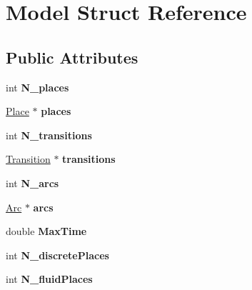\hypertarget{structModel}{\section{Model Struct Reference}
\label{structModel}
}
\subsection*{Public Attributes}
\begin{DoxyCompactItemize}
\item 
\hypertarget{structModel_a660f4623c98be1f351188bb2299284d9}{int {\bfseries N\-\_\-places}}\label{structModel_a660f4623c98be1f351188bb2299284d9}

\item 
\hypertarget{structModel_a68742d9a8f4a4a93bfb3f2687ecdccb9}{\hyperlink{structPlace}{Place} $\ast$ {\bfseries places}}\label{structModel_a68742d9a8f4a4a93bfb3f2687ecdccb9}

\item 
\hypertarget{structModel_a42637d14566751b5755f2b0d66529be4}{int {\bfseries N\-\_\-transitions}}\label{structModel_a42637d14566751b5755f2b0d66529be4}

\item 
\hypertarget{structModel_abbe7678bbc58a7e1e854dcb9545ed997}{\hyperlink{structTransition}{Transition} $\ast$ {\bfseries transitions}}\label{structModel_abbe7678bbc58a7e1e854dcb9545ed997}

\item 
\hypertarget{structModel_a01029e53564beb9b1442367cf08112ee}{int {\bfseries N\-\_\-arcs}}\label{structModel_a01029e53564beb9b1442367cf08112ee}

\item 
\hypertarget{structModel_a58148ba939d857deffff97e34fb73ecd}{\hyperlink{structArc}{Arc} $\ast$ {\bfseries arcs}}\label{structModel_a58148ba939d857deffff97e34fb73ecd}

\item 
\hypertarget{structModel_a1a0417363d2111802b5615bc8ade34fa}{double {\bfseries Max\-Time}}\label{structModel_a1a0417363d2111802b5615bc8ade34fa}

\item 
\hypertarget{structModel_a6f5c61ec7dd6f557f01699824ce82927}{int {\bfseries N\-\_\-discrete\-Places}}\label{structModel_a6f5c61ec7dd6f557f01699824ce82927}

\item 
\hypertarget{structModel_af3c6151959bd7e897aa7a0cf690632fe}{int {\bfseries N\-\_\-fluid\-Places}}\label{structModel_af3c6151959bd7e897aa7a0cf690632fe}


\end{DoxyCompactItemize}
